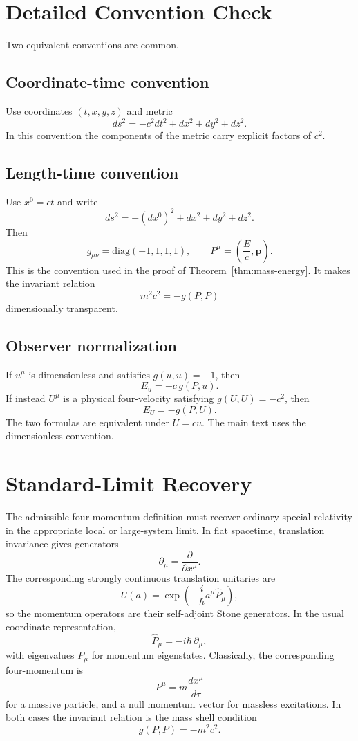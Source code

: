 \documentclass[12pt,a4paper]{article}
\theoremstyle{definition}
\theoremstyle{remark}
\begin{document}
\appendix
\section{Detailed Convention Check}
\label{app:conventions}

Two equivalent conventions are common.

\subsection{Coordinate-time convention}

Use coordinates $(t,x,y,z)$ and metric
\[
ds^2=-c^2dt^2+dx^2+dy^2+dz^2.
\]
In this convention the components of the metric carry explicit factors of $c^2$.

\subsection{Length-time convention}

Use $x^0=ct$ and write
\[
ds^2=-(dx^0)^2+dx^2+dy^2+dz^2.
\]
Then
\[
g_{\mu\nu}=\mathrm{diag}(-1,1,1,1),
\qquad
P^\mu=\left(\frac{E}{c},\mathbf p\right).
\]
This is the convention used in the proof of Theorem~\ref{thm:mass-energy}. It makes the invariant relation
\[
m^2c^2=-g(P,P)
\]
dimensionally transparent.

\subsection{Observer normalization}

If $u^\mu$ is dimensionless and satisfies $g(u,u)=-1$, then
\[
E_u=-c\,g(P,u).
\]
If instead $U^\mu$ is a physical four-velocity satisfying $g(U,U)=-c^2$, then
\[
E_U=-g(P,U).
\]
The two formulas are equivalent under $U=cu$. The main text uses the dimensionless convention.

\section{Standard-Limit Recovery}
\label{app:standard-limit}

The admissible four-momentum definition must recover ordinary special relativity in the appropriate local or large-system limit. In flat spacetime, translation invariance gives generators
\[
\partial_\mu=\frac{\partial}{\partial x^\mu}.
\]
The corresponding strongly continuous translation unitaries are
\[
U(a)=\exp\!\left(-\frac{i}{\hbar}a^\mu\hat P_\mu\right),
\]
so the momentum operators are their self-adjoint Stone generators. In the usual coordinate representation,
\[
\hat P_\mu=-i\hbar\,\partial_\mu,
\]
with eigenvalues $P_\mu$ for momentum eigenstates. Classically, the corresponding four-momentum is
\[
P^\mu=m\frac{dx^\mu}{d\tau}
\]
for a massive particle, and a null momentum vector for massless excitations. In both cases the invariant relation is the mass shell condition
\[
g(P,P)=-m^2c^2.
\]
\end{document}
